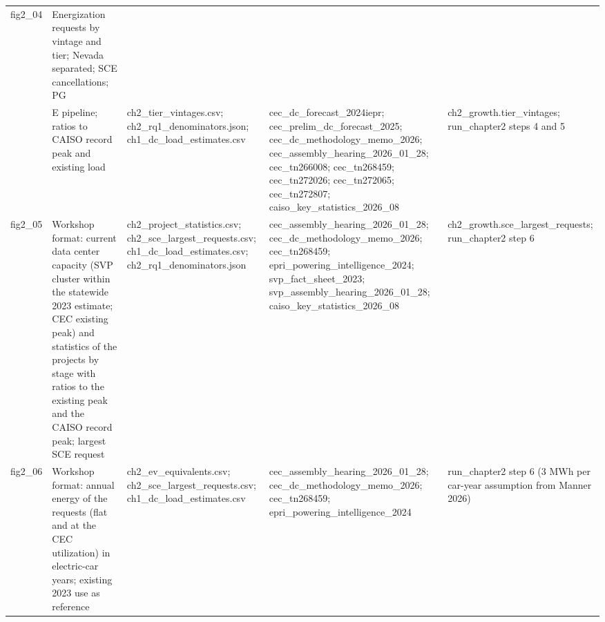 \begin{tabular}{lp{4.6cm}p{5.2cm}p{4.6cm}p{4.8cm}}
fig2\_\allowbreak{}04 & Energization requests by vintage and tier; Nevada separated; SCE cancellations; PG\\&E pipeline; ratios to CAISO record peak and existing load & ch2\_\allowbreak{}tier\_\allowbreak{}vintages.csv; ch2\_\allowbreak{}rq1\_\allowbreak{}denominators.json; ch1\_\allowbreak{}dc\_\allowbreak{}load\_\allowbreak{}estimates.csv & cec\_\allowbreak{}dc\_\allowbreak{}forecast\_\allowbreak{}2024iepr; cec\_\allowbreak{}prelim\_\allowbreak{}dc\_\allowbreak{}forecast\_\allowbreak{}2025; cec\_\allowbreak{}dc\_\allowbreak{}methodology\_\allowbreak{}memo\_\allowbreak{}2026; cec\_\allowbreak{}assembly\_\allowbreak{}hearing\_\allowbreak{}2026\_\allowbreak{}01\_\allowbreak{}28; cec\_\allowbreak{}tn266008; cec\_\allowbreak{}tn268459; cec\_\allowbreak{}tn272026; cec\_\allowbreak{}tn272065; cec\_\allowbreak{}tn272807; caiso\_\allowbreak{}key\_\allowbreak{}statistics\_\allowbreak{}2026\_\allowbreak{}08 & ch2\_\allowbreak{}growth.tier\_\allowbreak{}vintages; run\_\allowbreak{}chapter2 steps 4 and 5 \\
fig2\_\allowbreak{}05 & Workshop format: current data center capacity (SVP cluster within the statewide 2023 estimate; CEC existing peak) and statistics of the projects by stage with ratios to the existing peak and the CAISO record peak; largest SCE request & ch2\_\allowbreak{}project\_\allowbreak{}statistics.csv; ch2\_\allowbreak{}sce\_\allowbreak{}largest\_\allowbreak{}requests.csv; ch1\_\allowbreak{}dc\_\allowbreak{}load\_\allowbreak{}estimates.csv; ch2\_\allowbreak{}rq1\_\allowbreak{}denominators.json & cec\_\allowbreak{}assembly\_\allowbreak{}hearing\_\allowbreak{}2026\_\allowbreak{}01\_\allowbreak{}28; cec\_\allowbreak{}dc\_\allowbreak{}methodology\_\allowbreak{}memo\_\allowbreak{}2026; cec\_\allowbreak{}tn268459; epri\_\allowbreak{}powering\_\allowbreak{}intelligence\_\allowbreak{}2024; svp\_\allowbreak{}fact\_\allowbreak{}sheet\_\allowbreak{}2023; svp\_\allowbreak{}assembly\_\allowbreak{}hearing\_\allowbreak{}2026\_\allowbreak{}01\_\allowbreak{}28; caiso\_\allowbreak{}key\_\allowbreak{}statistics\_\allowbreak{}2026\_\allowbreak{}08 & ch2\_\allowbreak{}growth.sce\_\allowbreak{}largest\_\allowbreak{}requests; run\_\allowbreak{}chapter2 step 6 \\
fig2\_\allowbreak{}06 & Workshop format: annual energy of the requests (flat and at the CEC utilization) in electric-car years; existing 2023 use as reference & ch2\_\allowbreak{}ev\_\allowbreak{}equivalents.csv; ch2\_\allowbreak{}sce\_\allowbreak{}largest\_\allowbreak{}requests.csv; ch1\_\allowbreak{}dc\_\allowbreak{}load\_\allowbreak{}estimates.csv & cec\_\allowbreak{}assembly\_\allowbreak{}hearing\_\allowbreak{}2026\_\allowbreak{}01\_\allowbreak{}28; cec\_\allowbreak{}dc\_\allowbreak{}methodology\_\allowbreak{}memo\_\allowbreak{}2026; cec\_\allowbreak{}tn268459; epri\_\allowbreak{}powering\_\allowbreak{}intelligence\_\allowbreak{}2024 & run\_\allowbreak{}chapter2 step 6 (3 MWh per car-year assumption from Manner 2026) \\
\bottomrule
\end{tabular}